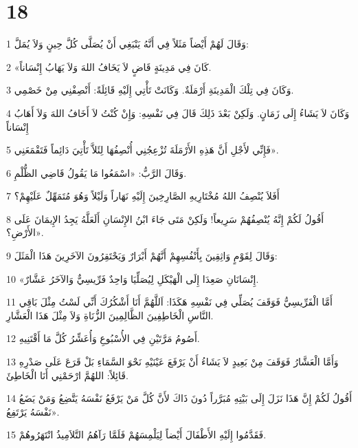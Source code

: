 \chapter{18}

\par 1 وَقَالَ لَهُمْ أَيْضاً مَثَلاً فِي أَنَّهُ يَنْبَغِي أَنْ يُصَلَّى كُلَّ حِينٍ وَلاَ يُمَلَّ:
\par 2 «كَانَ فِي مَدِينَةٍ قَاضٍ لاَ يَخَافُ اللهَ وَلاَ يَهَابُ إِنْسَاناً.
\par 3 وَكَانَ فِي تِلْكَ الْمَدِينَةِ أَرْمَلَةٌ. وَكَانَتْ تَأْتِي إِلَيْهِ قَائِلَةً: أَنْصِفْنِي مِنْ خَصْمِي.
\par 4 وَكَانَ لاَ يَشَاءُ إِلَى زَمَانٍ. وَلَكِنْ بَعْدَ ذَلِكَ قَالَ فِي نَفْسِهِ: وَإِنْ كُنْتُ لاَ أَخَافُ اللهَ وَلاَ أَهَابُ إِنْسَاناً
\par 5 فَإِنِّي لأَجْلِ أَنَّ هَذِهِ الأَرْمَلَةَ تُزْعِجُنِي أُنْصِفُهَا لِئَلاَّ تَأْتِيَ دَائِماً فَتَقْمَعَنِي».
\par 6 وَقَالَ الرَّبُّ: «اسْمَعُوا مَا يَقُولُ قَاضِي الظُّلْمِ.
\par 7 أَفَلاَ يُنْصِفُ اللهُ مُخْتَارِيهِ الصَّارِخِينَ إِلَيْهِ نَهَاراً وَلَيْلاً وَهُوَ مُتَمَهِّلٌ عَلَيْهِمْ؟
\par 8 أَقُولُ لَكُمْ إِنَّهُ يُنْصِفُهُمْ سَرِيعاً! وَلَكِنْ مَتَى جَاءَ ابْنُ الإِنْسَانِ أَلَعَلَّهُ يَجِدُ الإِيمَانَ عَلَى الأَرْضِ؟».
\par 9 وَقَالَ لِقَوْمٍ وَاثِقِينَ بِأَنْفُسِهِمْ أَنَّهُمْ أَبْرَارٌ وَيَحْتَقِرُونَ الآخَرِينَ هَذَا الْمَثَلَ:
\par 10 «إِنْسَانَانِ صَعِدَا إِلَى الْهَيْكَلِ لِيُصَلِّيَا وَاحِدٌ فَرِّيسِيٌّ وَالآخَرُ عَشَّارٌ.
\par 11 أَمَّا الْفَرِّيسِيُّ فَوَقَفَ يُصَلِّي فِي نَفْسِهِ هَكَذَا: اَللَّهُمَّ أَنَا أَشْكُرُكَ أَنِّي لَسْتُ مِثْلَ بَاقِي النَّاسِ الْخَاطِفِينَ الظَّالِمِينَ الزُّنَاةِ وَلاَ مِثْلَ هَذَا الْعَشَّارِ.
\par 12 أَصُومُ مَرَّتَيْنِ فِي الأُسْبُوعِ وَأُعَشِّرُ كُلَّ مَا أَقْتَنِيهِ.
\par 13 وَأَمَّا الْعَشَّارُ فَوَقَفَ مِنْ بَعِيدٍ لاَ يَشَاءُ أَنْ يَرْفَعَ عَيْنَيْهِ نَحْوَ السَّمَاءِ بَلْ قَرَعَ عَلَى صَدْرِهِ قَائِلاً: اللهُمَّ ارْحَمْنِي أَنَا الْخَاطِئَ.
\par 14 أَقُولُ لَكُمْ إِنَّ هَذَا نَزَلَ إِلَى بَيْتِهِ مُبَرَّراً دُونَ ذَاكَ لأَنَّ كُلَّ مَنْ يَرْفَعُ نَفْسَهُ يَتَّضِعُ وَمَنْ يَضَعُ نَفْسَهُ يَرْتَفِعُ».
\par 15 فَقَدَّمُوا إِلَيْهِ الأَطْفَالَ أَيْضاً لِيَلْمِسَهُمْ فَلَمَّا رَآهُمُ التَّلاَمِيذُ انْتَهَرُوهُمْ.
